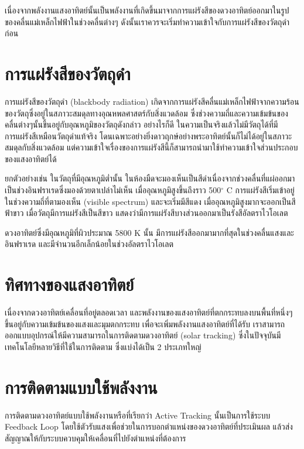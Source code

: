 \documentclass[a4paper,nobib,openany,10pt]{tufte-book}
\begin{document}
เนื่องจากพลังงานแสงอาทิตย์นั้นเป็นพลังงานที่เกิดขึ้นมาจากการแผ่รังสีของดวงอาทิตย์ออกมาในรูปของคลื่นแม่เหล็กไฟฟ้าในช่วงคลื่นต่างๆ
ดังนั้นเราควรจะเริ่มทำความเข้าใจกับการแผ่รังสีของวัตถุดำก่อน

\section{การแผ่รังสีของวัตถุดำ}
\label{sec:orgfa85cdb}

การแผ่รังสีของวัตถุดำ (blackbody radiation) เกิดจากการแผ่รังสีคลื่นแม่เหล็กไฟฟ้าจากความร้อนของวัตถุซึ่งอยู่ในสภาวะสมดุลทางอุณหพลศาสตร์กับสิ่งแวดล้อม
ซึ่งช่วงความถี่และความเข้มข้นของคลื่นต่างๆนั้นขึ้นอยู่กับอุณหภูมิของวัตถุดังกล่าว
อย่างไรก็ดี
ในความเป็นจริงแล้วไม่มีวัตถุได้ที่มีการแผ่รังสีเหมือนวัตถุดำแท้จริง
โดนเฉพาะอย่างยิ่งดาวฤกษ์อย่างพระอาทิตย์นั้นก็ไม่ได้อยู่ในสภาวะสมดุลกับสิ่งแวดล้อม
แต่ความเข้าใจเรื่องของการแผ่รังสีนี้ก็สามารถนำมาใช้ทำความเข้าใจส่วนประกอบของแสงอาทิตย์ได้

ยกตัวอย่างเช่น ในวัตถุที่มีอุณหภูมิต่ำนั้น
ในห้องมืดจะมองเห็นเป็นสีดำเนื่องจากช่วงคลื่นที่แผ่ออกมาเป็นช่วงอินฟราเรดซึ่งมองด้วยตาเปล่าไม่เห็น
เมื่ออุณหภูมิสูงขึ้นถึงราว 500\(^{\circ}\) C
การแผ่รังสีเริ่มเข้าอยู่ในช่วงความถี่ที่ตามองเห็น (visible spectrum)
และจะเริ่มมีสีแดง เมื่ออุณหภูมิสูงมากจะออกเป็นสีฟ้าขาว
เมื่อวัตถุมีการแผ่รังสีเป็นสีขาว
แสดงว่ามีการแผ่รังสีบางส่วนออกมาเป็นรังสีอัลตราไวโอเลต

ดวงอาทิตย์ซึ่งมีอุณหภูมิที่ผิวประมาณ 5800 K นั้น
มีการแผ่รังสีออกมามากที่สุดในช่วงคลื่นแสงและอินฟราเรด
และมีจำนวนอีกเล็กน้อยในช่วงอัลตราไวโอเลต

\section{ทิศทางของแสงอาทิตย์}
\label{sec:org11ff726}
เนื่องจากดวงอาทิตย์เคลื่อนที่อยู่ตลอดเวลา
และพลังงานของแสงอาทิตย์ที่ตกกระทบลงบนพื้นที่หนึ่งๆขึ้นอยู่กับความเข้มข้นของแสงและมุมตกกระทบ
เพื่อจะเพิ่มพลังงานแสงอาทิตย์ที่ได้รับ
เราสามารถออกแบบอุปกรณ์ให้มีความสามารถในการติดตามดวงอาทิตย์ (solar
tracking) ซึ่งในปัจจุบันมีเทคโนโลยีหลายวิธีที่ใช้ในการติดตาม
ซึ่งแบ่งได้เป็น 2 ประเภทใหญ่

\section{การติดตามแบบใช้พลังงาน}
\label{sec:org02d7263}
การติดตามดวงอาทิตย์แบบใช้พลังงานหรือที่เรียกว่า Active Tracking
นั้นเป็นการใช้ระบบ Feedback Loop
โดยใช้ตัวรับแสงเพื่อช่วยในการบอกตำแหน่งของดวงอาทิตย์ที่ประเมินผล
แล้วส่งสัญญาณให้กับระบบควบคุมให้เคลื่อนที่ไปยังตำแหน่งที่ต้องการ
\end{document}
